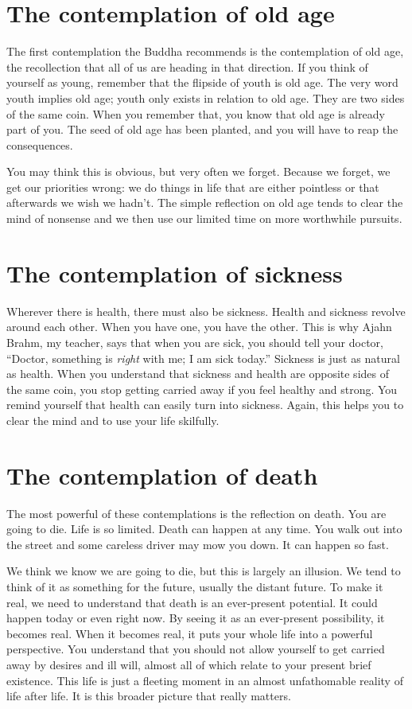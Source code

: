 \documentclass[12pt,openany]{book}
\begin{document}
\section*{The contemplation of old age}

The first contemplation the Buddha recommends is the contemplation of old age, the recollection that all of us are heading in that direction. If you think of yourself as young, remember that the flipside of youth is old age. The very word youth implies old age; youth only exists in relation to old age. They are two sides of the same coin. When you remember that, you know that old age is already part of you. The seed of old age has been planted, and you will have to reap the consequences.

You may think this is obvious, but very often we forget. Because we forget, we get our priorities wrong: we do things in life that are either pointless or that afterwards we wish we hadn’t. The simple reflection on old age tends to clear the mind of nonsense and we then use our limited time on more worthwhile pursuits.

\section*{The contemplation of sickness}

Wherever there is health, there must also be sickness. Health and sickness revolve around each other. When you have one, you have the other. This is why Ajahn Brahm, my teacher, says that when you are sick, you should tell your doctor, “Doctor, something is \textit{right} with me; I am sick today.” Sickness is just as natural as health. When you understand that sickness and health are opposite sides of the same coin, you stop getting carried away if you feel healthy and strong. You remind yourself that health can easily turn into sickness. Again, this helps you to clear the mind and to use your life skilfully.

\section*{The contemplation of death}

The most powerful of these contemplations is the reflection on death. You are going to die. Life is so limited. Death can happen at any time. You walk out into the street and some careless driver may mow you down. It can happen so fast.

We think we know we are going to die, but this is largely an illusion. We tend to think of it as something for the future, usually the distant future. To make it real, we need to understand that death is an ever-present potential. It could happen today or even right now. By seeing it as an ever-present possibility, it becomes real. When it becomes real, it puts your whole life into a powerful perspective. You understand that you should not allow yourself to get carried away by desires and ill will, almost all of which relate to your present brief existence. This life is just a fleeting moment in an almost unfathomable reality of life after life. It is this broader picture that really matters.
\end{document}
